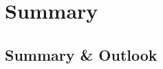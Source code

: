 \documentclass[\main/dresen_thesis.tex]{subfiles}
\begin{document}
\chapter{Summary}\label{ch:summary}

\section{Summary \& Outlook}
\end{document}

